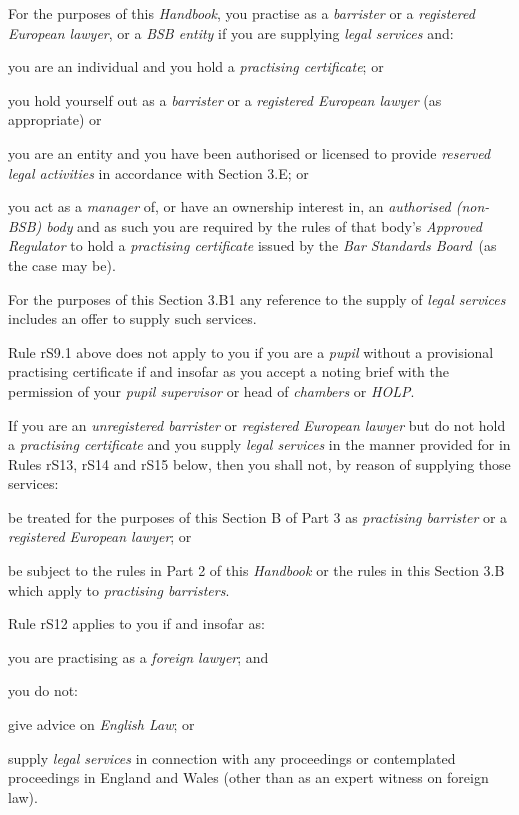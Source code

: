 For the purposes of this \emph{Handbook}, you practise as a
\emph{barrister} or a \emph{registered European lawyer}, or a \emph{BSB
entity} if you are supplying \emph{legal services} and:
\nl\item you are an individual and you hold a \emph{practising certificate};
or
\item you hold yourself out as a \emph{barrister} or a \emph{registered
European lawyer} (as appropriate) or
\item you are an entity and you have been authorised or licensed to provide
\emph{reserved legal activities} in accordance with Section 3.E; or
\item you act as a \emph{manager} of, or have an ownership interest in, an
\emph{authorised (non-BSB) body} and as such you are required by the
rules of that body's \emph{Approved Regulator} to hold a
\emph{practising certificate} issued by the \emph{Bar Standards
Board}~(as the case may be).
\ln
{}

For the purposes of this Section 3.B1 any reference to the supply of
\emph{legal services} includes an offer to supply such services.


Rule rS9.1 above does not apply to you if you are a \emph{pupil} without
a provisional practising certificate if and insofar as you accept a
noting brief with the permission of your \emph{pupil supervisor} or head
of \emph{chambers} or \emph{HOLP}.


If you are an \emph{unregistered barrister} or \emph{registered European
lawyer} but do not hold a \emph{practising certificate} and you supply
\emph{legal services} in the manner provided for in Rules rS13, rS14 and
rS15 below, then you shall not, by reason of supplying those services:
\nl\item be treated for the purposes of this Section B of Part 3 as
\emph{practising barrister} or a \emph{registered European lawyer}; or
\item be subject to the rules in Part 2 of this \emph{Handbook} or the
rules in this Section 3.B which apply to \emph{practising barristers}.
\ln
{}

Rule rS12 applies to you if and insofar as:
\nl\item you are practising as a \emph{foreign lawyer}; and
\item you do not:
\begin{alphlist}
\item give advice on \emph{English Law}; or

\item supply \emph{legal services} in connection with any proceedings or
contemplated proceedings in England and Wales (other than as an expert
witness on foreign law).\end{alphlist}
\ln
{}


